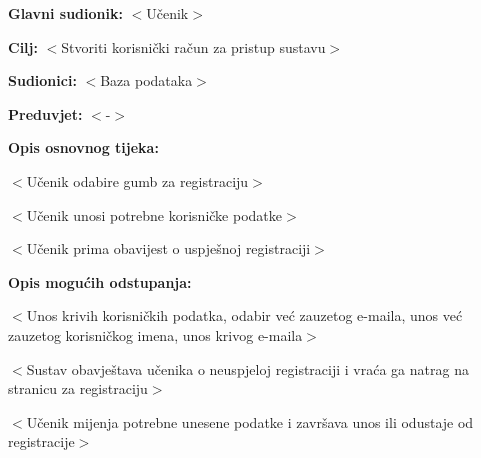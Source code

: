 					\noindent {}
					\begin{packed_item}
	
						\item \textbf{Glavni sudionik: }$<$Učenik$>$
						\item  \textbf{Cilj:} $<$Stvoriti korisnički račun za pristup sustavu$>$
						\item  \textbf{Sudionici:} $<$Baza podataka$>$
						\item  \textbf{Preduvjet:} $<$-$>$
						\item  \textbf{Opis osnovnog tijeka:}
						
						\item[] \begin{packed_enum}
	
							\item $<$Učenik odabire gumb za registraciju$>$
							\item $<$Učenik unosi potrebne korisničke podatke$>$
							\item $<$Učenik prima obavijest o uspješnoj registraciji$>$
						\end{packed_enum}
						
						\item  \textbf{Opis mogućih odstupanja:}
						
						\item[] \begin{packed_item}
	
							\item[2.a] $<$Unos krivih korisničkih podatka, odabir već zauzetog e-maila, unos već zauzetog korisničkog imena, unos krivog e-maila$>$
							\item[] \begin{packed_enum}
								
								\item $<$Sustav obavještava učenika o neuspjeloj registraciji i vraća ga natrag na stranicu za registraciju$>$
								\item $<$Učenik mijenja potrebne unesene podatke i završava unos ili odustaje od registracije$>$
								
							\end{packed_enum}
							
						\end{packed_item}
					\end{packed_item}

